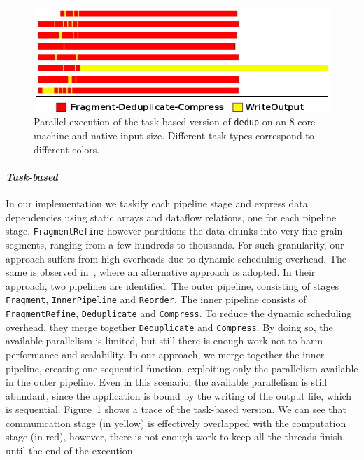 {\begin{figure}[!t]%
	\centering
	\includegraphics[width=0.9\columnwidth]{task_benchmarks/figures/dedup-ompss-native-8-2dp_tasks}%
	\caption{Parallel execution of the task-based version of \texttt{dedup} on an 8-core machine and native input size. Different task types correspond to different colors.}%
	\label{fig:dedup-2dp_tasks-trace}%
	\vspace{.5cm}
\end{figure}


\paragraph{\textit{Task-based}}
In our implementation we taskify each pipeline stage and express data dependencies using static arrays and dataflow relations, one for each pipeline stage.
\texttt{FragmentRefine} however partitions the data chunks into very fine grain segments, ranging from a few hundreds to thousands. For such granularity,
our approach suffers from high overheads due to dynamic schedulnig overhead. 
The same is observed in~\cite{Vandierendonck:2013:DSP:2503210.2503233}, where 
an alternative approach is adopted. In their approach, two pipelines are identified: The outer pipeline, consisting of stages \texttt{Fragment}, \texttt{InnerPipeline}
and \texttt{Reorder}. The inner pipeline consists of \texttt{FragmentRefine}, \texttt{Deduplicate} and \texttt{Compress}.  To reduce the dynamic scheduling overhead,
they merge together \texttt{Deduplicate} and \texttt{Compress}. By doing so, the available parallelism is limited, but still there is enough work not to harm performance
and scalability. In our approach, we merge together the inner pipeline, creating one sequential function, exploiting only the parallelism available in the outer pipeline.
Even in this scenario, the available parallelism is still abundant, since the application is bound by the writing of the output file, which is sequential.  
Figure~\ref{fig:dedup-2dp_tasks-trace} shows a trace of the task-based version.  We can see that communication stage (in yellow) is effectively overlapped with the computation stage (in red), however,
there is not enough work to keep all the threads finish, until the end of the execution.

}
